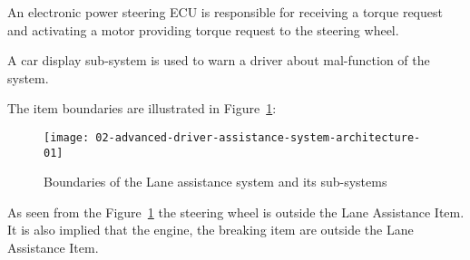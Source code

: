 An electronic power steering ECU is responsible for receiving a torque
request and activating a motor providing torque request to the steering 
wheel. 

A car display sub-system is used to warn a driver about mal-function of the 
system.

The item boundaries are illustrated in Figure~\ref{fig:boundaries}:

\begin{figure}[htbp]
\texttt{[image: 02-advanced-driver-assistance-system-architecture-01]}
\caption{Boundaries of the Lane assistance system and its sub-systems}
\label{fig:boundaries}
\end{figure}



As seen from the Figure~\ref{fig:boundaries} the steering wheel is 
outside the Lane Assistance Item.
It is also implied that the engine, the breaking item are outside 
the Lane Assistance Item.


